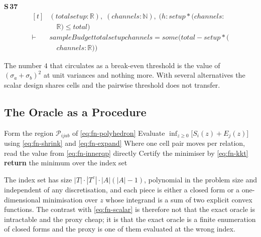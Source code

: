 \noindent\textbf{S\,37}\quad{}
{\footnotesize\[ \begin{aligned}[t]
&(\mathit{total} \mathit{setup} : \mathbb{R} ),\; (\mathit{channels} : \mathbb{N} ),\; (\mathit{h} : \mathit{setup} * (\mathit{channels} :\\
&\quad \mathbb{R} ) \leq \mathit{total})\\
\vdash\;&\mathit{sampleBudget} \mathit{total} \mathit{setup} \mathit{channels} = \mathit{some} (\mathit{total} - \mathit{setup} * (\\
&\quad \mathit{channels} : \mathbb{R} ))
\end{aligned} \]}


The number $4$ that circulates as a break-even threshold is the value of
$(\sigma_{a}+\sigma_{b})^{2}$ at unit variances and nothing more. With several alternatives
the scalar design shares cells and the pairwise threshold does not transfer.

\subsection{The Oracle as a Procedure}
\label{sec:fn-procedure}

\begin{algorithm}[htbp]
\caption{Exact certification energy}
\label{alg:fn-oracle}
\begin{algorithmic}[1]
  \STATE Form the region $\mathcal{P}_{ijab}$ of \eqref{eq:fn-polyhedron}
  \STATE Evaluate $\inf_{z\ge0}\bigl[S_{i}(z)+E_{j}(z)\bigr]$ using
         \eqref{eq:fn-shrink} and \eqref{eq:fn-expand}
  \STATE Where one cell pair moves per relation, read the value from
         \eqref{eq:fn-innerqp} directly
  \STATE Certify the minimiser by \eqref{eq:fn-kkt} 
\ENDFOR
\STATE \textbf{return} the minimum over the index set
\end{algorithmic}
\end{algorithm}

The index set has size $|T|\cdot|T^{c}|\cdot|A|(|A|-1)$, polynomial in the problem size and
independent of any discretisation, and each piece is either a closed form or a
one-dimensional minimisation over $z$ whose integrand is a sum of two explicit convex
functions. The contrast with \eqref{eq:fn-scalar} is therefore not that the exact oracle is
intractable and the proxy cheap; it is that the exact oracle is a finite enumeration of
closed forms and the proxy is one of them evaluated at the wrong index.


